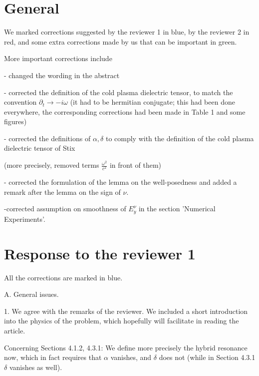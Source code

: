 \documentclass[a4paper,10pt]{article}
\title{}
\author{}
\begin{document}
\maketitle

\begin{abstract}

\end{abstract}

\section{General}

We marked corrections suggested by the reviewer 1 in blue, by the reviewer 2 in red, 
and some extra corrections made by us that can be important in green.

More important corrections include

- changed the wording in the abstract

- corrected the definition of the cold plasma dielectric tensor, to match the convention $\partial_t\rightarrow -i\omega$ (it had to be hermitian conjugate; 
this had been done everywhere, the corresponding corrections had been made in Table 1 and some figures)

- corrected the definitions of $\alpha,\delta$ to comply with the definition of the cold plasma dielectric tensor of Stix 

(more precisely, removed terms $\frac{\omega^2}{c^2}$ in 
front of them)

- corrected the formulation of the lemma on the well-posedness and added a remark after the lemma on the sign of $\nu$.

-corrected assumption on smoothness of $E_y^{\nu}$ in the section 'Numerical Experiments'.



\section{Response to the reviewer 1}

All the corrections are marked in blue. 

A. General issues.

1. We agree with the remarks of the reviewer. We included a short introduction into the physics of the problem, 
which hopefully will facilitate in reading the article. 

Concerning Sections 4.1.2, 4.3.1: 
We define more precisely the hybrid resonance now, which in fact requires that $\alpha$ vanishes, 
and $\delta$ does not (while in Section 4.3.1 $\delta$ vanishes as well).
\end{document}
